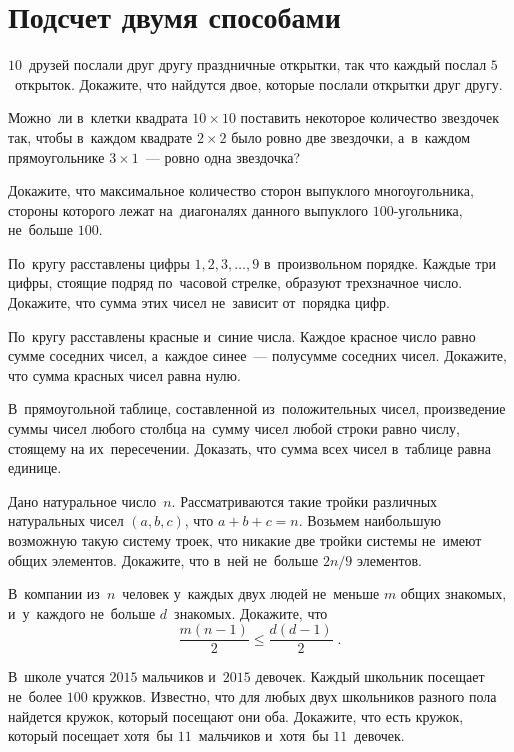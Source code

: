 
\section*{Подсчет двумя способами}


\begin{problems}

\item
$10$~друзей послали друг другу праздничные открытки, так что каждый послал
$5$~открыток.
Докажите, что найдутся двое, которые послали открытки друг другу.

\item
Можно~ли в~клетки квадрата $10 \times 10$ поставить некоторое количество
звездочек так, чтобы в~каждом квадрате $2 \times 2$ было ровно две звездочки,
а~в~каждом прямоугольнике $3 \times 1$~--- ровно одна звездочка?

\item
Докажите, что максимальное количество сторон выпуклого многоугольника, стороны
которого лежат на~диагоналях данного выпуклого $100$-угольника, не~больше
$100$.

\item
По~кругу расставлены цифры $1, 2, 3,\ldots, 9$ в~произвольном порядке.
Каждые три цифры, стоящие подряд по~часовой стрелке, образуют трехзначное
число.
Докажите, что сумма этих чисел не~зависит от~порядка цифр.

\item
По~кругу расставлены красные и~синие числа.
Каждое красное число равно сумме соседних чисел, а~каждое синее~--- полусумме
соседних чисел.
Докажите, что сумма красных чисел равна нулю.

\item
В~прямоугольной таблице, составленной из~положительных чисел, произведение
суммы чисел любого столбца на~сумму чисел любой строки равно числу, стоящему
на их~пересечении.
Доказать, что сумма всех чисел в~таблице равна единице.

\item
Дано натуральное число~$n$.
Рассматриваются такие тройки различных натуральных чисел $(a, b, c)$, что
$a + b + c = n$.
Возьмем наибольшую возможную такую систему троек, что никакие две тройки
системы не~имеют общих элементов.
Докажите, что в~ней не~больше $2 n / 9$ элементов.

\item
В~компании из~$n$~человек у~каждых двух людей не~меньше $m$ общих
знакомых, и~у~каждого не~больше $d$~знакомых.
Докажите, что
\[
    \frac{m (n - 1)}{2}
\leq
    \frac{d (d - 1)}{2}
\;.\]

\item
В~школе учатся $2015$ мальчиков и~$2015$ девочек.
Каждый школьник посещает не~более $100$ кружков.
Известно, что для любых двух школьников разного пола найдется кружок, который
посещают они оба.
Докажите, что есть кружок, который посещает хотя~бы $11$~мальчиков и~хотя~бы
$11$~девочек.

\end{problems}

